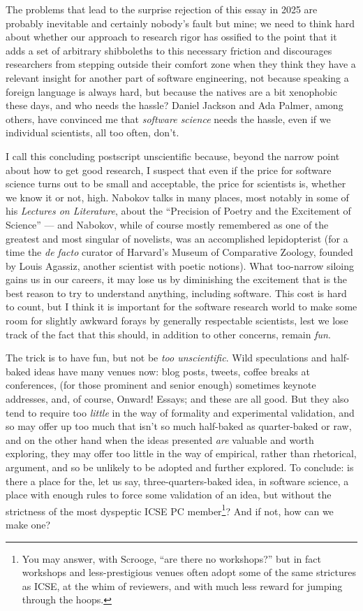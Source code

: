 \documentclass[sigplan,screen]{acmart}
\begin{document}
The problems that
lead to the surprise rejection of this essay in 2025 are probably inevitable
and certainly nobody's fault but mine; we need to think hard about whether our approach
to research rigor has ossified to the point that it adds a set of
arbitrary shibboleths to this necessary friction and discourages
researchers from stepping outside their comfort zone when
they think they have a relevant insight for another part of software engineering,
not because speaking a foreign language is always hard, but because
the natives are a bit xenophobic these days, and who needs the hassle?
Daniel Jackson and Ada Palmer, among others, have convinced me that
\emph{software science} needs the hassle, even if we individual scientists, all
too often, don't.

I call this concluding postscript unscientific because, beyond the
narrow point about how to get good research, I suspect that even if
the price for software science turns out to be small and acceptable,
the price for scientists is, whether we know it or not, high.  Nabokov
talks in many places, most notably in some of his \emph{Lectures on
  Literature}, about the ``Precision of Poetry and the Excitement of
Science'' --- and Nabokov, while of course mostly remembered as one of
the greatest and most singular of novelists, was an accomplished
lepidopterist (for a time the \emph{de facto} curator of Harvard's Museum of
Comparative Zoology, founded by Louis Agassiz, another scientist with
poetic notions).  What too-narrow siloing gains us in our careers, it
may lose us by diminishing the excitement that is the best reason to try to
understand anything, including software.  This cost is hard to count,
but I think it is important for the software research world to make
some room for slightly awkward forays by generally respectable scientists, lest we lose track of the fact
that this should, in addition to other concerns, remain \emph{fun}.

The trick is to have fun, but not be \emph{too unscientific}.  Wild
speculations and half-baked ideas have many venues now:  blog posts, tweets,
coffee breaks at conferences, (for those prominent and senior
enough) sometimes keynote addresses, and, of course, Onward! Essays;
and these are all good.  But they
also tend to require too \emph{little} in the way of formality and
experimental validation, and so may offer up too much that isn't so
much half-baked as quarter-baked or raw, and on the other hand when the ideas
presented \emph{are} valuable and worth exploring, they may offer too little
in the way of empirical, rather than rhetorical, argument, and so be
unlikely to be adopted and further explored.  To conclude:  is there a place for
the, let us say, three-quarters-baked idea, in software science, a
place with enough rules to force some validation of an idea, but
without the strictness of the most dyspeptic ICSE PC
member\footnote{You may answer, with Scrooge, ``are there no
  workshops?'' but in fact workshops and less-prestigious venues often
  adopt some of the same strictures as ICSE, at the whim of reviewers,
  and with much less reward for jumping through the hoops.}?  And
if not, how can we make one?
\end{document}
